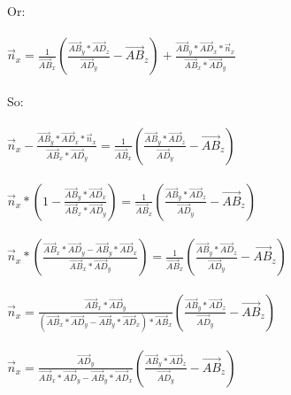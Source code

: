 \documentclass{article}
\begin{document}
			Or:\\\\
			
			$\vec{n}_x = \frac{1}{\overrightarrow{AB}_x}\left(\frac{\overrightarrow{AB}_y * \overrightarrow{AD}_z}{\overrightarrow{AD}_y} - \overrightarrow{AB}_z\right) + \frac{\overrightarrow{AB}_y * \overrightarrow{AD}_x * \vec{n}_x}{\overrightarrow{AB}_x * \overrightarrow{AD}_y}$\\\\
			
			So:\\\\
			
			$\vec{n}_x - \frac{\overrightarrow{AB}_y * \overrightarrow{AD}_x * \vec{n}_x}{\overrightarrow{AB}_x * \overrightarrow{AD}_y} = \frac{1}{\overrightarrow{AB}_x}\left(\frac{\overrightarrow{AB}_y * \overrightarrow{AD}_z}{\overrightarrow{AD}_y} - \overrightarrow{AB}_z\right)$\\\\
			
			$\vec{n}_x * \left(1 - \frac{\overrightarrow{AB}_y * \overrightarrow{AD}_x}{\overrightarrow{AB}_x * \overrightarrow{AD}_y}\right) = \frac{1}{\overrightarrow{AB}_x}\left(\frac{\overrightarrow{AB}_y * \overrightarrow{AD}_z}{\overrightarrow{AD}_y} - \overrightarrow{AB}_z\right)$\\\\
			
			$\vec{n}_x * \left(\frac{\overrightarrow{AB}_x * \overrightarrow{AD}_y - \overrightarrow{AB}_y * \overrightarrow{AD}_x}{\overrightarrow{AB}_x * \overrightarrow{AD}_y}\right) = \frac{1}{\overrightarrow{AB}_x}\left(\frac{\overrightarrow{AB}_y * \overrightarrow{AD}_z}{\overrightarrow{AD}_y} - \overrightarrow{AB}_z\right)$\\\\
			
			$\vec{n}_x = \frac{\overrightarrow{AB}_x * \overrightarrow{AD}_y}{(\overrightarrow{AB}_x * \overrightarrow{AD}_y - \overrightarrow{AB}_y * \overrightarrow{AD}_x) * \overrightarrow{AB}_x}\left(\frac{\overrightarrow{AB}_y * \overrightarrow{AD}_z}{\overrightarrow{AD}_y} - \overrightarrow{AB}_z\right)$\\\\

			$\vec{n}_x = \frac{\overrightarrow{AD}_y}{\overrightarrow{AB}_x * \overrightarrow{AD}_y - \overrightarrow{AB}_y * \overrightarrow{AD}_x}\left(\frac{\overrightarrow{AB}_y * \overrightarrow{AD}_z}{\overrightarrow{AD}_y} - \overrightarrow{AB}_z\right)$\\\\
			
\end{document}
